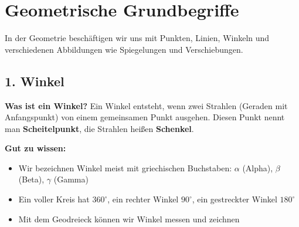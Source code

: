 
\section*{Geometrische Grundbegriffe}

In der Geometrie beschäftigen wir uns mit Punkten, Linien, Winkeln und verschiedenen Abbildungen wie Spiegelungen und Verschiebungen.

\subsection*{1. Winkel}

\textbf{Was ist ein Winkel?}
Ein Winkel entsteht, wenn zwei Strahlen (Geraden mit Anfangspunkt) von einem gemeinsamen Punkt ausgehen. Diesen Punkt nennt man \textbf{Scheitelpunkt}, die Strahlen heißen \textbf{Schenkel}.

\begin{center}
\end{center}

\textbf{Gut zu wissen:}
\begin{itemize}
    \item Wir bezeichnen Winkel meist mit griechischen Buchstaben: $\alpha$ (Alpha), $\beta$ (Beta), $\gamma$ (Gamma)
    \item Ein voller Kreis hat $360^\circ$, ein rechter Winkel $90^\circ$, ein gestreckter Winkel $180^\circ$
    \item Mit dem Geodreieck können wir Winkel messen und zeichnen
\end{itemize}

